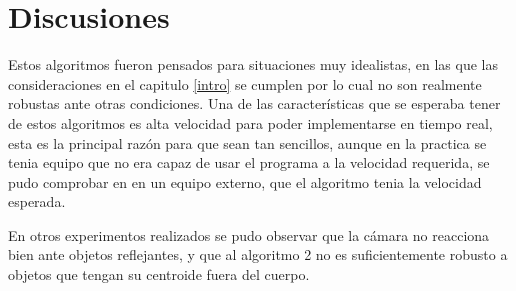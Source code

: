     
    \section{Discusiones}
    
    Estos algoritmos fueron pensados para situaciones muy idealistas, en las que las consideraciones en el capitulo \ref{intro} se cumplen por lo cual no son realmente robustas ante otras condiciones. Una de las características que se esperaba tener de estos algoritmos es alta velocidad para poder implementarse en tiempo real, esta es la principal razón para que sean tan sencillos, aunque en la practica se tenia equipo que no era capaz de usar el programa a la velocidad requerida, se pudo comprobar en en un equipo externo, que el algoritmo tenia la velocidad esperada.
    
        
    
    En otros experimentos realizados se pudo observar que la cámara no reacciona bien ante objetos reflejantes, y que al algoritmo 2 no es suficientemente robusto a objetos que tengan su centroide  fuera del cuerpo.
    
    

    